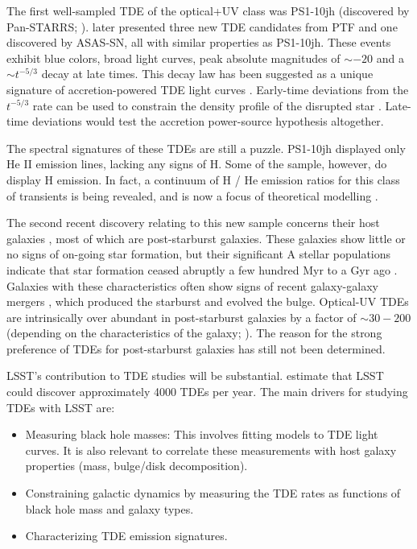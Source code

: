 The first well-sampled TDE of the optical+UV class was PS1-10jh (discovered by Pan-STARRS;
\citealt{Gezari2012}). \citet{Arcavi2014} later presented three new TDE candidates
from PTF and one discovered by ASAS-SN, all with similar properties
as PS1-10jh. These events exhibit blue colors, broad light curves,
peak absolute magnitudes of $\sim-20$ and a $\sim t^{-5/3}$ decay
at late times. This decay law has been suggested as a unique signature
of accretion-powered TDE light curves \citep{Rees1988, Evans1989, Phinney1989}.
Early-time deviations from the $t^{-5/3}$ rate
can be used to constrain the density profile of the disrupted star
\citep{Lodato2009, Gezari2012}. Late-time deviations would
test the accretion power-source hypothesis altogether.

The spectral signatures of these TDEs are still a puzzle. PS1-10jh displayed
only He II emission lines, lacking any signs of H. Some of the \citet{Arcavi2014}
sample, however, do display H emission.
In fact, a continuum of H / He emission ratios for this class of transients
is being revealed, and is now a focus of theoretical modelling \citep{Strubbe2015, Roth2015}.

The second recent discovery relating to this new sample concerns their
host galaxies \citep{Arcavi2014, French2016}, most of which are
post-starburst galaxies. These galaxies show little or no signs of on-going star formation, but their significant A stellar populations indicate that star formation ceased abruptly a few hundred Myr to a Gyr ago \citep{Dressler1983}. Galaxies with these characteristics often show signs of recent galaxy-galaxy mergers \citep{Zabludoff1996}, which produced the starburst and evolved the bulge. Optical-UV TDEs are intrinsically over abundant in post-starburst galaxies by a factor of $\sim30-200$ (depending on the characteristics of the galaxy; \citealt{French2016}). The reason for the strong preference of TDEs for post-starburst galaxies has still not been determined.

LSST's contribution to TDE studies will be substantial.
\citet{VanVelzen2011} estimate that LSST could discover approximately
4000 TDEs per year. The main drivers for studying TDEs with LSST are:
\begin{itemize}
\item Measuring black hole masses: This involves fitting models to TDE
light curves. It is also relevant to correlate these measurements with
host galaxy properties (mass, bulge/disk decomposition).
\item Constraining galactic dynamics by measuring the TDE rates as
functions of black hole mass and galaxy types.
\item Characterizing TDE emission signatures.
\end{itemize}

